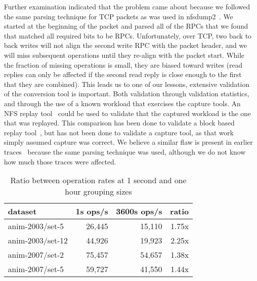 Further examination indicated that the problem came about because we
followed the same parsing technique for TCP packets as was used in
nfsdump2~\cite{ellardTraces}.  We started at the beginning of the
packet and parsed all of the RPCs that we found that matched all
required bits to be RPCs.  Unfortunately, over TCP, two back to back
writes will not align the second write RPC with the packet header, and
we will miss subsequent operations until they re-align with the packet
start.  While the fraction of missing operations is small, they are
biased toward writes (read replies can only be affected if the second
read reply is close enough to the first that they are combined).  This
leads us to one of our lessons, extensive validation of the conversion
tool is important.  Both validation through validation statistics, and
through the use of a known workload that exercises the capture tools.
 An NFS replay tool~\cite{NingningFast05} could be used to
validate that the captured workload is the one that was replayed.
This comparison has been done to validate a block based replay
tool~\cite{AndersonFast04}, but has not been done to validate a
capture tool, as that work simply assumed capture was correct.
We believe a similar
flaw is present in earlier traces~\cite{ellardTraces} because the same
parsing technique was used, although we do not know how much those traces were
affected.

\begin{table}
\begin{tabular}{|l|r|r|r|}
\hline
dataset & 1s ops/s & 3600s ops/s & ratio \\
\hline
anim-2003/set-5  & 26,445 & 15,110 & 1.75x \\
anim-2003/set-12 & 44,926 & 19,923 & 2.25x \\
anim-2007/set-2  & 75,457 & 54,657 & 1.38x \\
anim-2007/set-5  & 59,727 & 41,550 & 1.44x \\
\hline
\end{tabular}
\caption{Ratio between operation rates at 1 second and one hour grouping sizes}
\label{table:99quant-differences}
\end{table}

